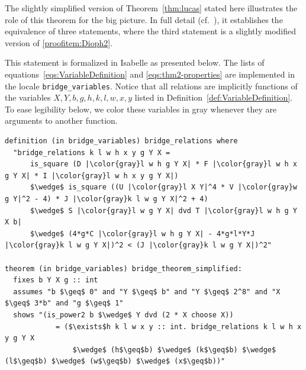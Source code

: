 \documentclass[a4paper,USenglish,cleveref,autoref,thm-restate]{lipics-v2021}
\newcommand{\bLowercase}{\mathfrak{b}}
\begin{document}
\begin{remark}
    The slightly simplified version of Theorem~\ref{thm:lucas} stated here illustrates the role of this theorem for the big picture. In full detail (cf.~\cite[Theorem~2]{manuscript}), it establishes the equivalence of three statements, where the third statement is a slightly modified version of \cref{proofitem:Dioph2}. 
\end{remark}


This statement is formalized in Isabelle as presented below. The lists of equations~\eqref{eqs:VariableDefinition} and \eqref{eqs:thm2-properties} are implemented in the locale \texttt{bridge\_variables}. Notice that all relations are implicitly functions of the variables $X,Y,b,g,h,k,l,w,x,y$ listed in Definition~\ref{def:VariableDefinition}. To ease legibility below, we color these variables in gray whenever they are arguments to another function.

\begin{lstlisting}[escapechar={|}]
definition (in bridge_variables) bridge_relations where
  "bridge_relations k l w h x y g Y X =
      is_square (D |\color{gray}l w h g Y X| * F |\color{gray}l w h x g Y X| * I |\color{gray}l w h x y g Y X|)
      $\wedge$ is_square ((U |\color{gray}l X Y|^4 * V |\color{gray}w g Y|^2 - 4) * J |\color{gray}k l w g Y X|^2 + 4)
      $\wedge$ S |\color{gray}l w g Y X| dvd T |\color{gray}l w h g Y X b|
      $\wedge$ (4*g*C |\color{gray}l w h g Y X| - 4*g*l*Y*J |\color{gray}k l w g Y X|)^2 < (J |\color{gray}k l w g Y X|)^2"

theorem (in bridge_variables) bridge_theorem_simplified:
  fixes b Y X g :: int
  assumes "b $\geq$ 0" and "Y $\geq$ b" and "Y $\geq$ 2^8" and "X $\geq$ 3*b" and "g $\geq$ 1"
  shows "(is_power2 b $\wedge$ Y dvd (2 * X choose X))
            = ($\exists$h k l w x y :: int. bridge_relations k l w h x y g Y X
                $\wedge$ (h$\geq$b) $\wedge$ (k$\geq$b) $\wedge$ (l$\geq$b) $\wedge$ (w$\geq$b) $\wedge$ (x$\geq$b))"
\end{lstlisting}
\end{document}
